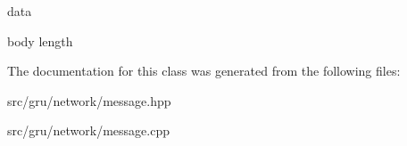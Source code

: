 data 

body length 

\-The documentation for this class was generated from the following files\-:\begin{DoxyCompactItemize}
\item 
src/gru/network/message.\-hpp\item 
src/gru/network/message.\-cpp\end{DoxyCompactItemize}
